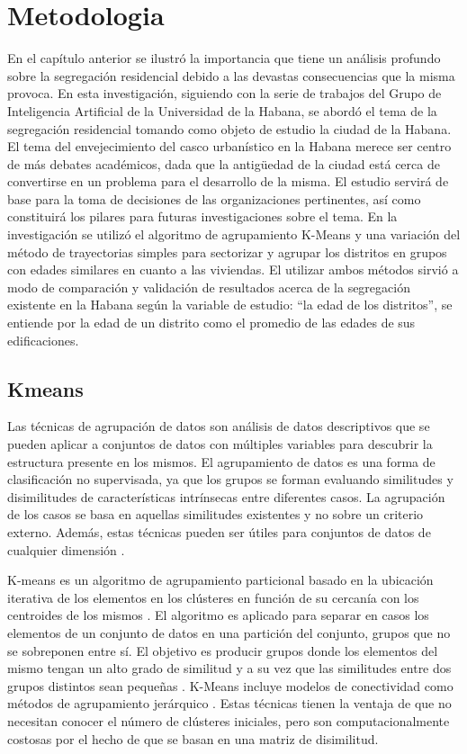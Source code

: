 

\chapter{Metodologia} 

En el capítulo anterior se ilustró la importancia que tiene un análisis profundo sobre la segregación residencial debido a las devastas consecuencias que la misma provoca. En esta investigación, siguiendo con la serie de trabajos del Grupo de Inteligencia Artificial de la Universidad de la Habana, se abordó el tema de la segregación residencial tomando como objeto de estudio la ciudad de la Habana. El tema del envejecimiento del casco urbanístico en la Habana merece ser centro de más debates académicos, dada que la antigüedad de la ciudad está cerca de convertirse en un problema para el desarrollo de la misma. El estudio servirá de base para la toma de decisiones de las organizaciones pertinentes, así como constituirá los pilares para futuras investigaciones sobre el tema. En la investigación se utilizó el algoritmo de agrupamiento K-Means y una variación del método de trayectorias simples para sectorizar y agrupar los distritos en grupos con edades similares en cuanto a las viviendas. El utilizar ambos métodos sirvió a modo de comparación y validación de resultados acerca de la segregación existente en la Habana según la variable de estudio: “la edad de los distritos”, se entiende por la edad de un distrito como el promedio de las edades de sus edificaciones.


\section{Kmeans}

Las técnicas de agrupación de datos son análisis de datos descriptivos que se pueden aplicar a conjuntos de datos con múltiples variables para descubrir la estructura presente en los mismos. El agrupamiento de datos es una forma de clasificación no supervisada, ya que los grupos se forman evaluando similitudes y disimilitudes de características intrínsecas entre diferentes casos. La agrupación de los casos se basa en aquellas similitudes existentes y no sobre un criterio externo. Además, estas técnicas pueden ser útiles para conjuntos de datos de cualquier dimensión \cite{Morissette2013TheKC}.

K-means es un algoritmo de agrupamiento particional basado en la ubicación iterativa de los elementos en los clústeres en función de su cercanía con los centroides de los mismos \cite{MacQueen1967SomeMF}. El algoritmo es aplicado para separar en casos los elementos de un conjunto de datos en una partición del conjunto, grupos que no se sobreponen entre sí. El objetivo es producir grupos donde los elementos del mismo tengan un alto grado de similitud y a su vez que las similitudes entre dos grupos distintos sean pequeñas \cite{Hastie2001TheEO}.
K-Means incluye modelos de conectividad como métodos de agrupamiento jerárquico \cite{Morissette2013TheKC}. Estas técnicas tienen la ventaja de que no necesitan conocer el número de clústeres iniciales, pero son computacionalmente costosas por el hecho de que se basan en una matriz de disimilitud.


